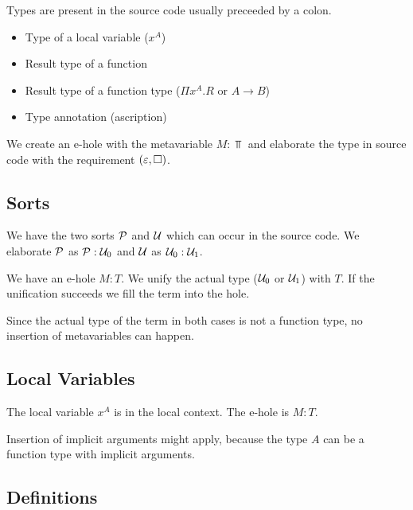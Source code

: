 Types are present in the source code usually preceeded by a colon.
\begin{itemize}
    \item Type of a local variable ($x^A$)

    \item Result type of a function

    \item Result type of a function type ($\Pi x^A.R$ or $A \to B$)

    \item Type annotation (ascription)
\end{itemize}

We create an e-hole with the metavariable $M: \Top$ and elaborate the type in
source code with the requirement $(\varepsilon, {\Box})$.






\subsection{Sorts}

We have the two sorts ${\mathcal P}$ and ${\mathcal U}$ which can occur in the source code. We
elaborate ${\mathcal P}$ as ${\mathcal P} : {\mathcal U}_0$ and ${\mathcal U}$ as ${\mathcal U}_0 : {\mathcal U}_1$.

We have an e-hole $M: T$. We unify the actual type (${\mathcal U}_0$ or ${\mathcal U}_1$) with
$T$. If the unification succeeds we fill the term into the hole.

Since the actual type of the term in both cases is not a function type, no
insertion of metavariables can happen.






\subsection{Local Variables}


The local variable $x^A$ is in the local context. The e-hole is $M: T$.

Insertion of implicit arguments might apply, because the type $A$ can be a
function type with implicit arguments.




\subsection{Definitions}


